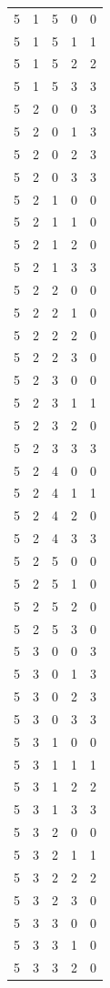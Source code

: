 \begin{longtable}{rrrrr}
5 & 1 & 5 & 0 & 0 \\
5 & 1 & 5 & 1 & 1 \\
5 & 1 & 5 & 2 & 2 \\
5 & 1 & 5 & 3 & 3 \\
5 & 2 & 0 & 0 & 3 \\
5 & 2 & 0 & 1 & 3 \\
5 & 2 & 0 & 2 & 3 \\
5 & 2 & 0 & 3 & 3 \\
5 & 2 & 1 & 0 & 0 \\
5 & 2 & 1 & 1 & 0 \\
5 & 2 & 1 & 2 & 0 \\
5 & 2 & 1 & 3 & 3 \\
5 & 2 & 2 & 0 & 0 \\
5 & 2 & 2 & 1 & 0 \\
5 & 2 & 2 & 2 & 0 \\
5 & 2 & 2 & 3 & 0 \\
5 & 2 & 3 & 0 & 0 \\
5 & 2 & 3 & 1 & 1 \\
5 & 2 & 3 & 2 & 0 \\
5 & 2 & 3 & 3 & 3 \\
5 & 2 & 4 & 0 & 0 \\
5 & 2 & 4 & 1 & 1 \\
5 & 2 & 4 & 2 & 0 \\
5 & 2 & 4 & 3 & 3 \\
5 & 2 & 5 & 0 & 0 \\
5 & 2 & 5 & 1 & 0 \\
5 & 2 & 5 & 2 & 0 \\
5 & 2 & 5 & 3 & 0 \\
5 & 3 & 0 & 0 & 3 \\
5 & 3 & 0 & 1 & 3 \\
5 & 3 & 0 & 2 & 3 \\
5 & 3 & 0 & 3 & 3 \\
5 & 3 & 1 & 0 & 0 \\
5 & 3 & 1 & 1 & 1 \\
5 & 3 & 1 & 2 & 2 \\
5 & 3 & 1 & 3 & 3 \\
5 & 3 & 2 & 0 & 0 \\
5 & 3 & 2 & 1 & 1 \\
5 & 3 & 2 & 2 & 2 \\
5 & 3 & 2 & 3 & 0 \\
5 & 3 & 3 & 0 & 0 \\
5 & 3 & 3 & 1 & 0 \\
5 & 3 & 3 & 2 & 0 \\

\end{longtable}
